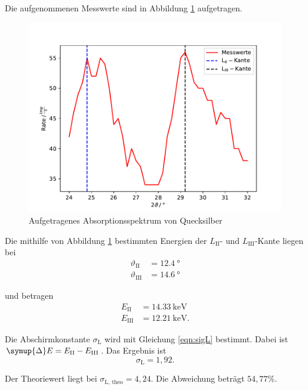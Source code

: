 Die aufgenommenen Messwerte sind in Abbildung \ref{fig:queck} aufgetragen.
\begin{figure}[H]
  \centering
  \includegraphics[width=\textwidth]{Plots/quecksilber.pdf}
  \caption{Aufgetragenes Absorptionsspektrum von Quecksilber}
  \label{fig:queck}
\end{figure}

Die mithilfe von Abbildung \ref{fig:queck} bestimmten Energien der $L_\text{II}$- und $L_\text{III}$-Kante liegen bei
\begin{align*}
  \vartheta_\text{II} &= \SI{12,4}{°} \\
  \vartheta_\text{III} &= \SI{14,6}{°}
\end{align*}

und betragen
\begin{align*}
  E_\text{II} &= \SI{14,33}{\keV} \\
  E_\text{III} &= \SI{12,21}{\keV}.
\end{align*}

Die Abschirmkonstante $\sigma_\text{L}$ wird mit Gleichung \eqref{eqn:sigL} bestimmt. Dabei ist $\symup{\Delta}E = E_\text{II}-E_\text{III}$.
Das Ergebnis ist
\begin{equation*}
  \sigma_\text{L} = 1,92.
\end{equation*}

Der Theoriewert liegt bei $\sigma_\text{L, theo} = 4,24$. Die Abweichung beträgt $54,77 \%$.
